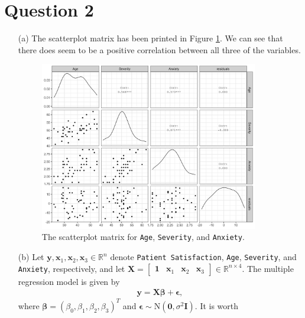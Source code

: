 \documentclass[10pt]{article}
\begin{document}
\section{Question 2} \noindent
\begin{itemize}
    \item[(a)] The scatterplot matrix has been printed in Figure \ref{ps-scatterplot}. We can see that there does seem to be a positive correlation between
    all three of the variables. 
    \begin{figure}
        \centering
        \includegraphics[width = 0.9\textwidth]{img/ps-correlation.png}
        \caption{The scatterplot matrix for \texttt{Age}, \texttt{Severity}, and \texttt{Anxiety}.}
        \label{ps-scatterplot}
    \end{figure}
    \item[(b)] Let \(\mathbf{y}, \mathbf{x}_1, \mathbf{x}_2, \mathbf{x}_3 \in \mathbb{R}^n\) denote \texttt{Patient Satisfaction}, \texttt{Age},
    \texttt{Severity}, and \texttt{Anxiety}, respectively, and let 
    \(\mathbf{X} = \begin{bmatrix}
        \mathbf{1} & \mathbf{x}_1 & \mathbf{x}_2 & \mathbf{x}_3
    \end{bmatrix} \in \mathbb{R}^{n \times 4}\).
    The multiple regression model is given by 
    \begin{align}
        \mathbf{y} =  \mathbf{X}\bm{\beta} + \bm{\epsilon},
        \label{ps-lm}
    \end{align}
    where \(\bm{\beta} = (\beta_0, \beta_1, \beta_2, \beta_3)^T\) and \(\bm{\epsilon} \sim \mathrm{N}(\mathbf{0}, \sigma^2 \mathbf{I})\). It is worth 

\end{itemize}
\end{document}
